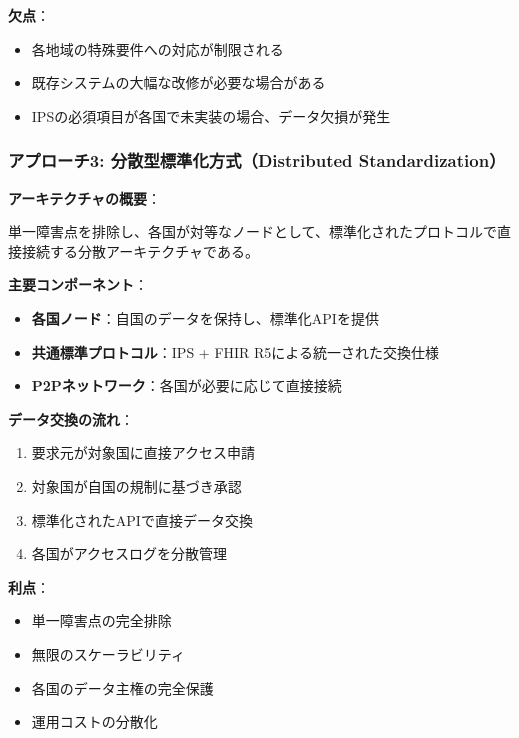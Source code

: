 \documentclass[
  a4paper,
  a4paper,
  11pt]{ltjsbook}
\providecommand{\tightlist}{%
  \setlength{\itemsep}{0pt}\setlength{\parskip}{0pt}}
\begin{document}
\textbf{欠点}：

\begin{itemize}
\tightlist
\item
  各地域の特殊要件への対応が制限される
\item
  既存システムの大幅な改修が必要な場合がある
\item
  IPSの必須項目が各国で未実装の場合、データ欠損が発生
\end{itemize}

\subsubsection{アプローチ3: 分散型標準化方式（Distributed
Standardization）}\label{ux30a2ux30d7ux30edux30fcux30c13-ux5206ux6563ux578bux6a19ux6e96ux5316ux65b9ux5f0fdistributed-standardization}

\textbf{アーキテクチャの概要}：

単一障害点を排除し、各国が対等なノードとして、標準化されたプロトコルで直接接続する分散アーキテクチャである。

\textbf{主要コンポーネント}：

\begin{itemize}
\tightlist
\item
  \textbf{各国ノード}：自国のデータを保持し、標準化APIを提供
\item
  \textbf{共通標準プロトコル}：IPS + FHIR R5による統一された交換仕様
\item
  \textbf{P2Pネットワーク}：各国が必要に応じて直接接続
\end{itemize}

\textbf{データ交換の流れ}：

\begin{enumerate}
\def\labelenumi{\arabic{enumi}.}
\tightlist
\item
  要求元が対象国に直接アクセス申請
\item
  対象国が自国の規制に基づき承認
\item
  標準化されたAPIで直接データ交換
\item
  各国がアクセスログを分散管理
\end{enumerate}

\textbf{利点}：

\begin{itemize}
\tightlist
\item
  単一障害点の完全排除
\item
  無限のスケーラビリティ
\item
  各国のデータ主権の完全保護
\item
  運用コストの分散化
\end{itemize}
\end{document}
